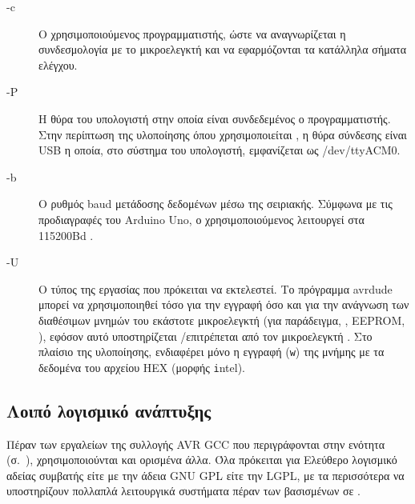 \begin{enumerate}
\begin{description}
        \item[-c] Ο χρησιμοποιούμενος προγραμματιστής, ώστε να αναγνωρίζεται η
        συνδεσμολογία με το μικροελεγκτή και να εφαρμόζονται τα κατάλληλα
        σήματα ελέγχου.

        \item[-P] Η θύρα του υπολογιστή στην οποία είναι συνδεδεμένος ο
        προγραμματιστής. Στην περίπτωση της υλοποίησης όπου χρησιμοποιείται
        , η θύρα σύνδεσης είναι USB η οποία, στο σύστημα του
        υπολογιστή, εμφανίζεται ως \slash{}dev\slash{}ttyACM0.

        \item[-b] Ο ρυθμός baud μετάδοσης δεδομένων μέσω της σειριακής. Σύμφωνα
        με τις προδιαγραφές του Arduino Uno, ο χρησιμοποιούμενος  λειτουργεί στα 115200Bd \parencite{arduino:environ}.

        \item[-U] Ο τύπος της εργασίας που πρόκειται να εκτελεστεί. Το πρόγραμμα
        avrdude μπορεί να χρησιμοποιηθεί τόσο για την εγγραφή όσο και για την
        ανάγνωση των διαθέσιμων μνημών του εκάστοτε μικροελεγκτή (για
        παράδειγμα, , EEPROM, ), εφόσον αυτό υποστηρίζεται%
        \slash{}επιτρέπεται από τον μικροελεγκτή \parencite{avrdude}. Στο
        πλαίσιο της υλοποίησης, ενδιαφέρει μόνο η εγγραφή (\verb~w~) της μνήμης
         με τα δεδομένα του αρχείου HEX (μορφής \verb~i~ntel).
    \end{description}

\end{enumerate}


\subsection{Λοιπό λογισμικό ανάπτυξης}

Πέραν των εργαλείων της συλλογής AVR GCC που περιγράφονται στην ενότητα
 (σ.~\pageref{subsubsec:avr:toolchain}),
χρησιμοποιούνται και ορισμένα άλλα. Όλα πρόκειται για Ελεύθερο λογισμικό αδείας
συμβατής είτε με την άδεια GNU GPL είτε την LGPL, με τα περισσότερα να
υποστηρίζουν πολλαπλά λειτουργικά συστήματα πέραν των βασισμένων σε .

